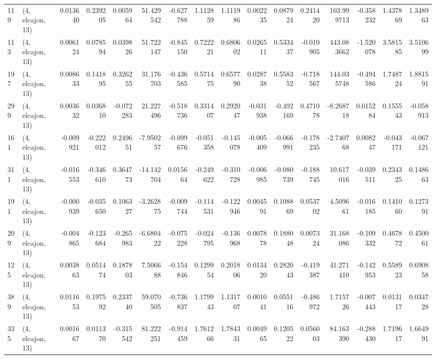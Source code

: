 \begin{tabular}{llrrrrrrrrrrrrrr}
119 &  (4, elcajon, 13) &   0.013640 &  0.239205 &  0.005964 &   51.429542 & -0.627788 &   1.112859 &  1.111986 &  0.002235 &  0.087924 &  0.241420 &  103.999713 & -0.358232 &  1.437869 &  1.348963 \\
113 &  (4, elcajon, 13) &   0.006124 &  0.078594 &  0.039826 &   51.722147 & -0.845150 &   0.722221 &  0.680602 &  0.026511 &  0.533437 & -0.010905 &  443.083662 & -1.520078 &  3.581585 &  3.510699 \\
197 &  (4, elcajon, 13) &   0.008633 &  0.141895 &  0.326255 &   31.176703 & -0.436585 &   0.571475 &  0.657790 &  0.028738 &  0.558352 & -0.718567 &  144.035748 & -0.494586 &  1.748724 &  1.881591 \\
299 &  (4, elcajon, 13) &   0.003632 &  0.036810 & -0.072283 &   21.227496 & -0.518736 &   0.331407 &  0.292047 & -0.031938 & -0.492169 &  0.471078 &   -8.268718 &  0.015284 &  0.155543 & -0.058913 \\
161 &  (4, elcajon, 13) &  -0.009921 & -0.222012 &  0.249651 &   -7.950257 & -0.099676 &  -0.051358 & -0.145078 & -0.005409 & -0.066991 & -0.178235 &   -2.740768 &  0.008247 & -0.043171 & -0.067121 \\
311 &  (4, elcajon, 13) &  -0.016553 & -0.346610 &  0.364773 &  -14.142704 &  0.015664 &  -0.249622 & -0.310728 & -0.006985 & -0.080739 & -0.188745 &   10.617016 & -0.039511 &  0.234325 &  0.148663 \\
191 &  (4, elcajon, 13) &  -0.000939 & -0.035650 &  0.106327 &   -3.262875 & -0.009744 &  -0.114531 & -0.122946 &  0.004591 &  0.108869 &  0.053702 &    4.509661 & -0.016185 &  0.141060 &  0.127391 \\
209 &  (4, elcajon, 13) &  -0.004865 & -0.123684 & -0.265983 &   -6.680422 & -0.075228 &  -0.024795 & -0.136968 &  0.007878 &  0.188048 &  0.007324 &   31.168086 & -0.109332 &  0.467872 &  0.450061 \\
125 &  (4, elcajon, 13) &   0.003863 &  0.051474 &  0.187803 &    7.506688 & -0.154846 &   0.129954 &  0.201806 &  0.013420 &  0.282043 & -0.419387 &   41.271410 & -0.142953 &  0.558923 &  0.690858 \\
389 &  (4, elcajon, 13) &   0.011653 &  0.197592 &  0.233740 &   59.070505 & -0.736837 &   1.179943 &  1.131707 &  0.001041 &  0.055116 & -0.486972 &    1.715726 & -0.007443 &  0.013117 &  0.034728 \\
335 &  (4, elcajon, 13) &   0.001667 &  0.011370 & -0.315542 &   81.222251 & -0.914459 &   1.761266 &  1.784331 &  0.004965 &  0.120522 &  0.056003 &   84.163390 & -0.288430 &  1.719617 &  1.664991 \\

\end{tabular}
